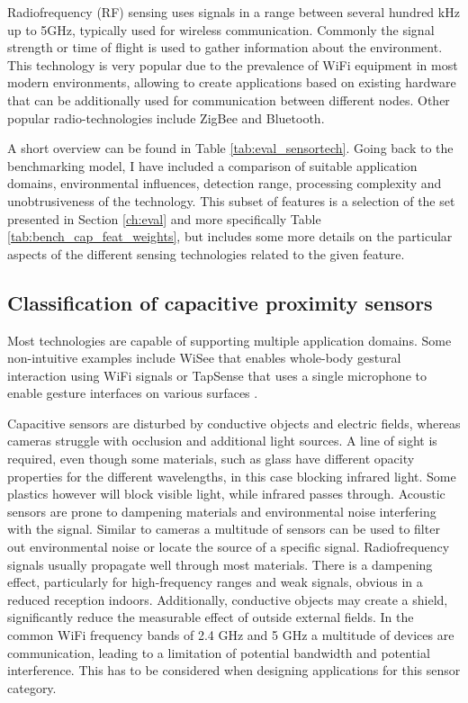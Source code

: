 Radiofrequency (RF) sensing uses signals in a range between several hundred kHz up to 5GHz, typically used for wireless communication. Commonly the signal strength or time of flight is used to gather information about the environment. This technology is very popular due to the prevalence of WiFi equipment in most modern environments, allowing to create applications based on existing hardware that can be additionally used for communication between different nodes. Other popular radio-technologies include ZigBee and Bluetooth.

A short overview can be found in Table \ref{tab:eval_sensortech}. Going back to the benchmarking model, I have included a comparison of suitable application domains, environmental influences, detection range, processing complexity and unobtrusiveness of the technology. This subset of features is a selection of the set presented in Section \ref{ch:eval} and more specifically Table \ref{tab:bench_cap_feat_weights}, but includes some more details on the particular aspects of the different sensing technologies related to the given feature.

\subsection{Classification of capacitive proximity sensors}
Most technologies are capable of supporting multiple application domains. Some non-intuitive examples include WiSee that enables whole-body gestural interaction using WiFi signals \cite{pu2013whole} or TapSense that uses a single microphone to enable gesture interfaces on various surfaces \cite{harrison2011tapsense}. 

Capacitive sensors are disturbed by conductive objects and electric fields, whereas cameras struggle with occlusion and additional light sources. A line of sight is required, even though some materials, such as glass have different opacity properties for the different wavelengths, in this case blocking infrared light. Some plastics however will block visible light, while infrared passes through. Acoustic sensors are prone to dampening materials and environmental noise interfering with the signal. Similar to cameras a multitude of sensors can be used to filter out environmental noise or locate the source of a specific signal. Radiofrequency signals usually propagate well through most materials. There is a dampening effect, particularly for high-frequency ranges and weak signals, obvious in a reduced reception indoors. Additionally, conductive objects may create a shield, significantly reduce the measurable effect of outside external fields. In the common WiFi frequency bands of 2.4 GHz and 5 GHz a multitude of devices are communication, leading to a limitation of potential bandwidth and potential interference. This has to be considered when designing applications for this sensor category. 

